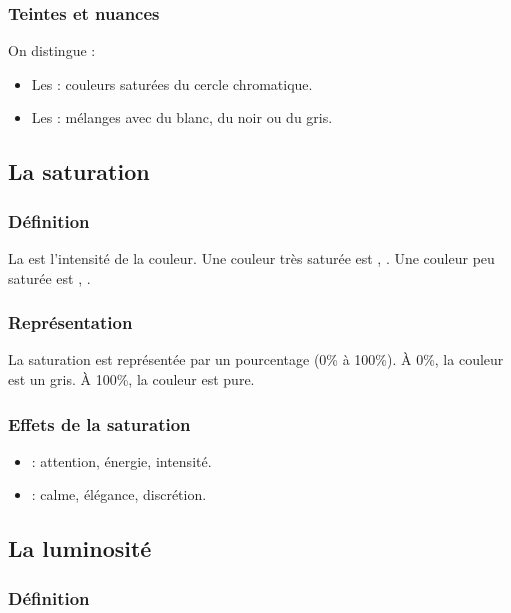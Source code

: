\subsubsection{Teintes et nuances}

On distingue :

\begin{itemize}
    \item Les  : couleurs saturées du cercle chromatique.
    \item Les  : mélanges avec du blanc, du noir ou du gris.
\end{itemize}

\subsection{La saturation}

\subsubsection{Définition}

La  est l'intensité de la couleur. Une couleur très saturée est , . Une couleur peu saturée est , .

\subsubsection{Représentation}

La saturation est représentée par un pourcentage (0\% à 100\%). À 0\%, la couleur est un gris. À 100\%, la couleur est pure.

\subsubsection{Effets de la saturation}

\begin{itemize}
    \item {} : attention, énergie, intensité.
    \item {} : calme, élégance, discrétion.
\end{itemize}

\subsection{La luminosité}

\subsubsection{Définition}

